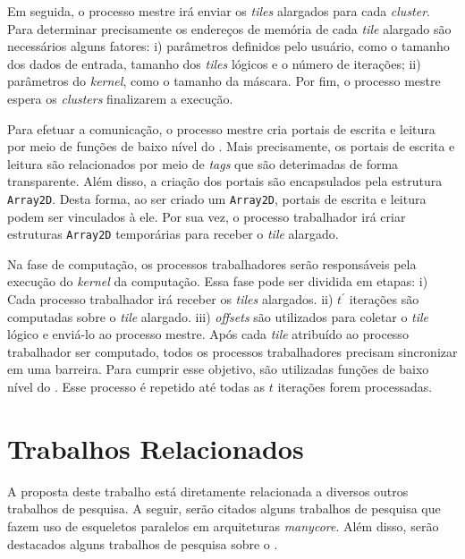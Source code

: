 Em seguida, o processo mestre irá enviar os \textit{tiles} alargados para cada
\textit{cluster}. Para determinar precisamente os endereços de memória de
cada \textit{tile} alargado são necessários alguns fatores: i) parâmetros
definidos pelo usuário, como o tamanho dos dados de entrada, tamanho dos
\textit{tiles} lógicos e o número de iterações; ii) parâmetros do \stencil
\textit{kernel}, como o tamanho da máscara. Por fim, o processo mestre espera os
\textit{clusters} finalizarem a execução.

Para efetuar a comunicação, o processo mestre cria portais de escrita e leitura
por meio de funções de baixo nível do \mppa. Mais precisamente, os portais de
escrita e leitura são relacionados por meio de \textit{tags} que são deterimadas
de forma transparente. Além disso, a criação dos portais são encapsulados pela
estrutura \texttt{Array2D}. Desta forma, ao ser criado um \texttt{Array2D},
portais de escrita e leitura podem ser vinculados à ele.  Por sua vez, o
processo trabalhador irá criar estruturas \texttt{Array2D} temporárias para
receber o \textit{tile} alargado.

Na fase de computação, os processos trabalhadores serão responsáveis pela
execução do \textit{kernel} da computação. Essa fase pode ser dividida em
etapas: i) Cada processo trabalhador irá receber os \textit{tiles} alargados.
ii) $t^\prime$ iterações são computadas sobre o \textit{tile} alargado. iii)
\textit{offsets} são utilizados para coletar o \textit{tile} lógico e enviá-lo
ao processo mestre. Após cada \textit{tile} atribuído ao processo trabalhador ser
computado, todos os processos trabalhadores precisam sincronizar em uma
barreira. Para cumprir esse objetivo, são utilizadas funções de baixo nível do
\mppa. Esse processo é repetido até todas as $t$ iterações forem processadas.


\section{Trabalhos Relacionados}

A proposta deste trabalho está diretamente relacionada a diversos outros trabalhos de pesquisa.
A seguir, serão citados alguns trabalhos de pesquisa que fazem uso de esqueletos paralelos em
arquiteturas \textit{manycore}. Além disso, serão destacados alguns trabalhos de pesquisa sobre
o \mppa.


